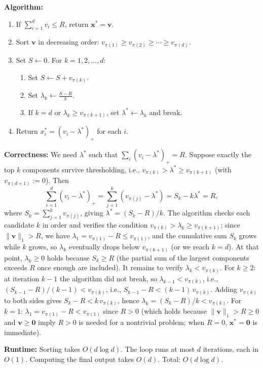 \textbf{Algorithm:}
\begin{enumerate}
\item If $\sum_{i=1}^d v_i \leq R$, return $\mathbf{x}^* = \mathbf{v}$.
\item Sort $\mathbf{v}$ in decreasing order: $v_{\pi(1)} \geq v_{\pi(2)} \geq \cdots \geq v_{\pi(d)}$.
\item Set $S \leftarrow 0$. For $k = 1, 2, \ldots, d$:
    \begin{enumerate}
        \item Set $S \leftarrow S + v_{\pi(k)}$.
        \item Set $\lambda_k \leftarrow \frac{S - R}{k}$.
        \item If $k = d$ or $\lambda_k \geq v_{\pi(k+1)}$, set $\lambda^* \leftarrow \lambda_k$ and break.
    \end{enumerate}
\item Return $x_i^* = (v_i - \lambda^*)_+$ for each $i$.
\end{enumerate}

\textbf{Correctness:} We need $\lambda^*$ such that $\sum_i (v_i - \lambda^*)_+ = R$. Suppose exactly the top $k$ components survive thresholding, i.e., $v_{\pi(k)} > \lambda^* \geq v_{\pi(k+1)}$ (with $v_{\pi(d+1)} := 0$). Then
\[
\sum_{i=1}^d (v_i - \lambda^*)_+ = \sum_{j=1}^k (v_{\pi(j)} - \lambda^*) = S_k - k\lambda^* = R,
\]
where $S_k = \sum_{j=1}^k v_{\pi(j)}$, giving $\lambda^* = (S_k - R)/k$. The algorithm checks each candidate $k$ in order and verifies the condition $v_{\pi(k)} > \lambda_k \geq v_{\pi(k+1)}$: since $\|\mathbf{v}\|_1 > R$, we have $\lambda_1 = v_{\pi(1)} - R \leq v_{\pi(1)}$, and the cumulative sum $S_k$ grows while $k$ grows, so $\lambda_k$ eventually drops below $v_{\pi(k+1)}$ (or we reach $k = d$). At that point, $\lambda_k \geq 0$ holds because $S_k \geq R$ (the partial sum of the largest components exceeds $R$ once enough are included). It remains to verify $\lambda_k < v_{\pi(k)}$. For $k \geq 2$: at iteration $k-1$ the algorithm did not break, so $\lambda_{k-1} < v_{\pi(k)}$, i.e., $(S_{k-1} - R)/(k-1) < v_{\pi(k)}$, i.e., $S_{k-1} - R < (k-1)\,v_{\pi(k)}$. Adding $v_{\pi(k)}$ to both sides gives $S_k - R < k\,v_{\pi(k)}$, hence $\lambda_k = (S_k - R)/k < v_{\pi(k)}$. For $k = 1$: $\lambda_1 = v_{\pi(1)} - R < v_{\pi(1)}$ since $R > 0$ (which holds because $\|\mathbf{v}\|_1 > R \geq 0$ and $\mathbf{v} \geq \mathbf{0}$ imply $R > 0$ is needed for a nontrivial problem; when $R = 0$, $\mathbf{x}^* = \mathbf{0}$ is immediate).

\textbf{Runtime:} Sorting takes $O(d \log d)$. The loop runs at most $d$ iterations, each in $O(1)$. Computing the final output takes $O(d)$. Total: $O(d \log d)$.
